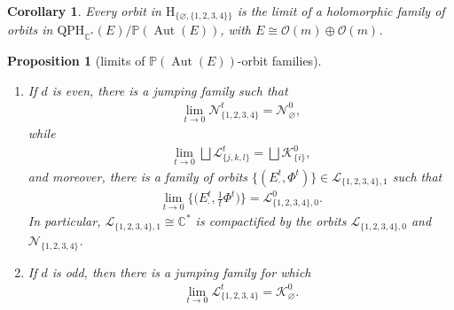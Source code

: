 \documentclass[pdftex]{sigma}
\newcommand{\field}[1]{\ensuremath{\mathbb{#1}}}
\newcommand{\CC}{\field{C}}
\newcommand{\PP}{\field{P}}
\newcommand{\calO}{\mathcal{O}}
\newcommand{\curly}[1]{\mathscr{#1}}
\newcommand{\cK}{\curly{K}}
\newcommand{\cL}{\curly{L}}
\newcommand{\cN}{\curly{N}}
\newcommand{\qp}{\boldsymbol{\cdot}}
\DeclareMathOperator{\Aut}{Aut}
\numberwithin{equation}{section}
\newtheorem{Corollary}[Theorem]{Corollary}
\newtheorem{Proposition}[Theorem]{Proposition}
 { \theoremstyle{definition}
\newtheorem{Definition}[Theorem]{Definition}
\newtheorem{Note}[Theorem]{Note}
\newtheorem{Example}[Theorem]{Example}
\newtheorem{Remark}[Theorem]{Remark} }
\begin{document}
\begin{Corollary}\label{cor:glue-H}
Every orbit in $\mathrm{H}_{\{\varnothing ,\{1,2,3,4\}\}}$ is the limit of a holomorphic family of orbits in $\mathrm{QPH}_{\CC^{*}}(E)/\PP(\Aut(E))$, with $E\cong \calO(m)\oplus\calO(m)$.
\end{Corollary}

\begin{Proposition}[limits of $\PP(\Aut(E))$-orbit families]\label{prop:glue}\quad
\begin{enumerate}\itemsep=0pt
\item[$(i)$] If $d$ is even, there is a jumping family such that\vspace{-1ex}
\begin{gather*}
\lim\limits_{t\to 0} \cN^{t}_{\{1,2,3,4\}} = \cN^{0}_{\varnothing },
\end{gather*}
while\vspace{-1ex}
\begin{gather*}
\lim\limits_{t\to 0} \bigsqcup \cL^{t}_{\{j,k,l\}} = \bigsqcup\cK^{0}_{\{i\}},
\end{gather*}
and moreover, there is a family of orbits $\{(E^{t}_{\qp},\Phi^{t})\}\in\cL_{\{1,2,3,4\},1}$ such that\vspace{-1ex}
\begin{gather*}
\lim\limits_{t\to 0}\bigg\{\bigg(E^{t}_{\qp},\frac{1}{t}\Phi^{t}\bigg)\bigg\} = \cL^{0}_{\{1,2,3,4\},0}.
\end{gather*}
In particular, $\cL_{\{1,2,3,4\},1}\cong\CC^{*}$ is compactified by the orbits $\cL_{\{1,2,3,4\},0}$ and $\cN_{\{1,2,3,4\}}$.
\item[$(ii)$] If $d$ is odd, then there is a jumping family for which\vspace{-1ex}
\begin{gather*}
\lim\limits_{t\to 0} \cL^{t}_{\{1,2,3,4\}} = \cK^{0}_{\varnothing }.
\end{gather*}
\end{enumerate}
\end{Proposition}
\end{document}
